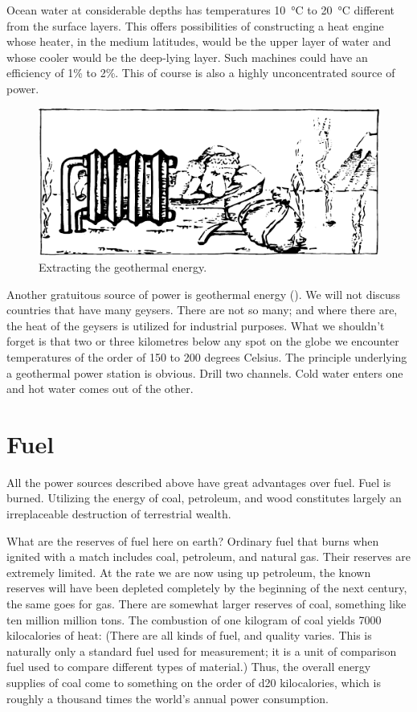 Ocean water at considerable depths has temperatures \SI{10}{\celsius} to \SI{20}{\celsius} different from the surface layers. This offers possibilities of constructing a heat engine whose heater, in the medium latitudes, would be the upper layer of water and whose cooler would be the deep-lying layer. Such machines could have an efficiency of 1\% to 2\%. This of course is also a highly unconcentrated source of power.


\begin{figure}[!ht]
\centering
\includegraphics[width=\textwidth]{figures/fig-06-01.pdf}
\caption{Extracting the geothermal energy.}
\label{fig-6.1}
\end{figure}

Another gratuitous source of power is geothermal ener­gy (). We will not discuss countries that have many geysers. There are not so many; and where there are, the heat of the geysers is utilized for industrial purposes. What we shouldn't forget is that two or three kilometres below any spot on the globe we encounter temperatures of the order of 150 to 200 degrees Celsius. The principle un­derlying a geothermal power station is obvious. Drill two channels. Cold water enters one and hot water comes out of the other.


\section{Fuel}
All the power sources described above have great ad­vantages over fuel. Fuel is burned. Utilizing the energy of coal, petroleum, and wood constitutes largely an irreplaceable destruction of terrestrial wealth.

What are the reserves of fuel here on earth? Ordinary fuel that burns when ignited with a match includes coal, petroleum, and natural gas. Their reserves are extremely limited. At the rate we are now using up petroleum, the known reserves will have been depleted completely by the beginning of the next century, the same goes for gas. There are somewhat larger reserves of coal, something like ten million million tons. The combustion of one kilogram of coal yields 7000 kilocalories of heat: (There are all kinds of fuel, and quality varies. This is naturally only a standard fuel used for measurement; it is a unit of comparison fuel used to compare different types of material.) Thus, the overall energy supplies of coal come to something on the order of \num{d20} kilocalories, which is roughly a thousand times the world's annual power consumption.

